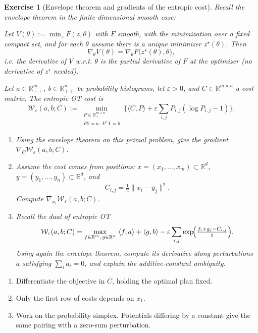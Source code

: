 \documentclass[11pt,a4paper]{article}
\theoremstyle{exostyle}
\newtheorem{exercise}{Exercise}
\newcommand{\R}{\mathbb{R}}
\newcommand{\W}{\mathcal{W}}
\begin{document}
\begin{exercise}[Envelope theorem and gradients of the entropic cost]\label{ex:envelope-entropic}
Recall the envelope theorem in the finite-dimensional smooth case:

\smallskip
\emph{Let} $V(\theta) := \min_{z} F(z,\theta)$ \emph{with} $F$ \emph{smooth, with the minimization over a fixed compact set, and for each} $\theta$ \emph{assume there is a unique minimizer} $z^\star(\theta)$. \emph{Then}
\[
\nabla_\theta V(\theta) = \nabla_\theta F\bigl(z^\star(\theta),\theta\bigr),
\]
i.e. the derivative of $V$ w.r.t. $\theta$ is the partial derivative of $F$ at the optimizer (no derivative of $z^\star$ needed).

\medskip
Let $a\in\mathbb R_{++}^m$, $b\in\mathbb R_{++}^n$ be probability histograms, let $\varepsilon>0$, and $C\in\mathbb R^{m\times n}$ a cost matrix. The entropic OT cost is
\[
\W_\varepsilon(a,b;C)
:= \min_{\substack{P\in\R_+^{m\times n}\\P\mathbf 1 = a,\ P^\top \mathbf 1 = b}}
\biggl\{ \langle C,P\rangle + \varepsilon \sum_{i,j} P_{i,j}(\log P_{i,j} - 1)\biggr\}.
\]
\begin{enumerate}[label=\textbf{(\arabic*)}]
  \item Using the envelope theorem on this \emph{primal} problem, give the gradient $\nabla_C \W_\varepsilon(a,b;C)$.
  \item Assume the cost comes from positions: $x=(x_1,\dots,x_m)\subset\R^d$, $y=(y_1,\dots,y_n)\subset\R^d$, and
  \[
  C_{i,j} = \tfrac12 \|x_i - y_j\|^2.
  \]
  Compute $\nabla_{x_1} \W_\varepsilon(a,b;C)$.
  \item Recall the dual of entropic OT
  \[
  \W_\varepsilon(a,b;C)
  = \max_{f\in\R^m,\,g\in\R^n} \ \langle f,a\rangle + \langle g,b\rangle
  - \varepsilon \sum_{i,j} \exp\!\Bigl(\tfrac{f_i + g_j - C_{i,j}}{\varepsilon}\Bigr).
  \]
  Using again the envelope theorem, compute its derivative along perturbations $\dot a$ satisfying $\sum_i\dot a_i=0$, and explain the additive-constant ambiguity.
\end{enumerate}
\end{exercise}
\begin{hints}
\begin{enumerate}[label=(\arabic*)]\item Differentiate the objective in $C$, holding the optimal plan fixed.\item Only the first row of costs depends on $x_1$.\item Work on the probability simplex. Potentials differing by a constant give the same pairing with a zero-sum perturbation.\end{enumerate}
\end{hints}
\end{document}
